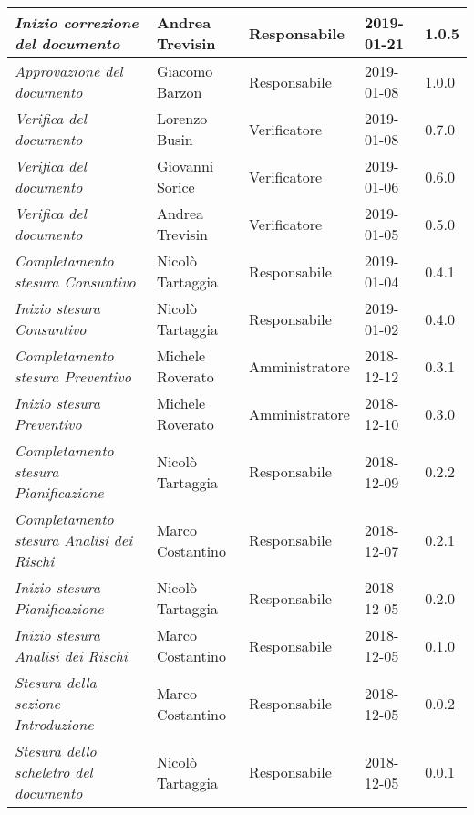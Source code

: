 \begin{longtable}{p{4cm}|C{3cm}|C{3cm}|R{2.5cm}|R{2cm}}
		\emph{Inizio correzione del documento} & Andrea Trevisin & Responsabile & 2019-01-21 & 1.0.5 \\
		\hline

		\emph{Approvazione del documento} & Giacomo Barzon & Responsabile & 2019-01-08 & 1.0.0 \\
		\hline

		\emph{Verifica del documento} & Lorenzo Busin & Verificatore & 2019-01-08 & 0.7.0 \\
		\hline

		\emph{Verifica del documento} & Giovanni Sorice & Verificatore & 2019-01-06 & 0.6.0 \\
		\hline

		\emph{Verifica del documento} & Andrea Trevisin & Verificatore & 2019-01-05 & 0.5.0 \\
		\hline

		\emph{Completamento stesura Consuntivo} & Nicolò Tartaggia & Responsabile & 2019-01-04 & 0.4.1 \\
		\hline

		\emph{Inizio stesura Consuntivo} & Nicolò Tartaggia & Responsabile & 2019-01-02 & 0.4.0 \\
		\hline

		\emph{Completamento stesura Preventivo} & Michele Roverato & Amministratore & 2018-12-12 & 0.3.1 \\
		\hline

		\emph{Inizio stesura Preventivo} & Michele Roverato & Amministratore & 2018-12-10 & 0.3.0 \\
		\hline

		\emph{Completamento stesura Pianificazione} & Nicolò Tartaggia & Responsabile & 2018-12-09 & 0.2.2 \\
		\hline

		\emph{Completamento stesura Analisi dei Rischi} & Marco Costantino & Responsabile & 2018-12-07 & 0.2.1 \\
		\hline

		\emph{Inizio stesura Pianificazione} & Nicolò Tartaggia & Responsabile & 2018-12-05 & 0.2.0 \\
		\hline

		\emph{\textit{Inizio stesura Analisi dei Rischi}} & Marco Costantino & Responsabile & 2018-12-05 & 0.1.0 \\
		\hline

		\emph{Stesura della sezione Introduzione} & Marco Costantino & Responsabile & 2018-12-05 & 0.0.2 \\
		\hline

		\emph{Stesura dello scheletro del documento} & Nicolò Tartaggia & Responsabile & 2018-12-05 & 0.0.1 \\

	\end{longtable}

\clearpage

